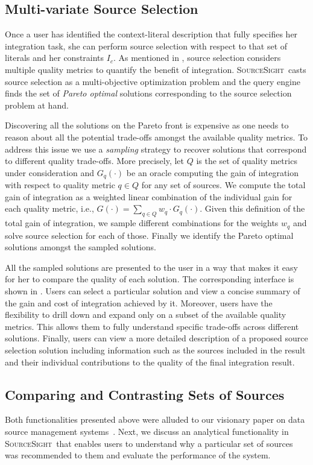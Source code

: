 \documentclass{vldb}
\newcommand\system{\textsc{SourceSight}}
\begin{document}
\subsection{Multi-variate Source Selection}
\label{sec:sourcesel}
Once a user has identified the context-literal description that fully specifies her integration task, she can perform source selection with respect to that set of literals and her constraints $I_c$. As mentioned in , source selection considers multiple quality metrics to quantify the benefit of integration. \system~casts source selection as a multi-objective optimization problem and the query engine finds the set of {\em Pareto optimal} solutions corresponding to the source selection problem at hand. 

Discovering all the solutions on the Pareto front is expensive as one needs to reason about all the potential trade-offs amongst the available quality metrics. To address this issue we use a {\em sampling} strategy to recover solutions that correspond to different quality trade-offs. More precisely, let $Q$ is the set of quality metrics under consideration and $G_q(\cdot)$ be an oracle computing the gain of integration with respect to quality metric $q \in Q$ for any set of sources. We compute the total gain of integration as a weighted linear combination of the individual gain for each quality metric, i.e., $G(\cdot) = \sum_{q \in Q} w_q \cdot G_q(\cdot)$. Given this definition of the total gain of integration, we sample different combinations for the weights $w_q$ and solve source selection for each of those. Finally we identify the Pareto optimal solutions amongst the sampled solutions. 

All the sampled solutions are presented to the user in a way that makes it easy for her to compare the quality of each solution. The corresponding interface is shown in . Users can select a particular solution and view a concise summary of the gain and cost of integration achieved by it. Moreover,  users have the flexibility to drill down and expand only on a subset of the available quality metrics. This allows them to fully understand specific trade-offs across different solutions. Finally, users can view a more detailed description of a proposed source selection solution including information such as the sources included in the result and their individual contributions to the quality of the final integration result. 

\subsection{Comparing and Contrasting Sets of Sources}
\label{sec:extensions}
Both functionalities presented above were alluded to our visionary paper on data source management systems~\cite{rekatsinas:2015}. Next, we discuss an analytical functionality in \system~that enables users to understand why a particular set of sources was recommended to them and evaluate the performance of the system.
\end{document}
